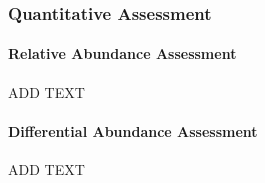 \documentclass[linenumbers]{bmcart}
\begin{document}
\subsubsection{Quantitative Assessment}

\paragraph{Relative Abundance Assessment}
ADD TEXT

\paragraph{Differential Abundance Assessment}
ADD TEXT


\end{document}
